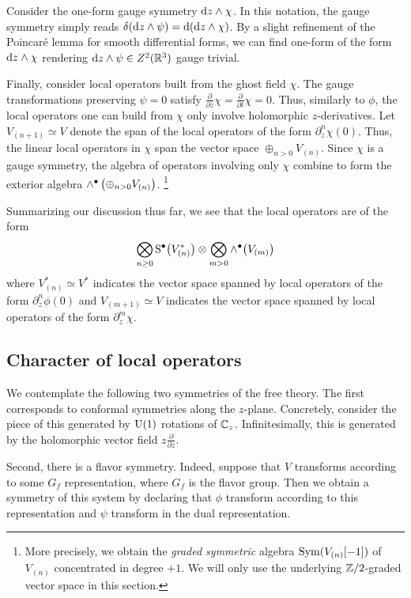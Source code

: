 \documentclass[11pt]{amsart}
\def\zbar{{\overline{z}}}
\def\U{{\rm U}}
\begin{document}
Consider the one-form gauge symmetry ${\rm d} z \wedge \chi$. 
In this notation, the gauge symmetry simply reads $\delta ({\rm d} z \wedge \psi) = {\rm d} ({\rm d} z \wedge \chi)$. 
By a slight refinement of the Poincar\'{e} lemma for smooth differential forms, we can find one-form of the form ${\rm d} z \wedge \chi$ rendering ${\rm d} z \wedge \psi \in Z^2(\mathbb R^3)$ gauge trivial. 

Finally, consider local operators built from the ghost field $\chi$. 
The gauge transformations preserving $\psi = 0$ satisfy $\frac{\partial}{\partial \zbar} \chi = \frac{\partial}{\partial t} \chi = 0$. 
Thus, similarly to $\phi$, the local operators one can build from $\chi$ only involve holomorphic $z$-derivatives. 
Let $V_{(n+1)} \simeq V$ denote the span of the local operators of the form $\partial_z^n \chi(0)$.
Thus, the linear local operators in $\chi$ span the vector space $\oplus_{n > 0} V_{(n)}$.
Since $\chi$ is a gauge symmetry, the algebra of operators involving only $\chi$ combine to form the exterior algebra $\wedge^\bullet \left(\oplus_{n > 0} V_{(n)}\right)$. 
\footnote{More precisely, we obtain the {\em graded symmetric} algebra $\operatorname{Sym}(V_{(n)}[-1])$ of $V_{(n)}$ concentrated in degree $+1$.
We will only use the underlying $\mathbb Z/2$-graded vector space in this section.}

Summarizing our discussion thus far, we see that the local operators are of the form
\[
\bigotimes_{n \geq 0} {\rm S}^\bullet \big(V^*_{(n)}\big) \otimes \bigotimes_{m > 0} \wedge^\bullet \big(V_{(m)}\big)
\]
where $V_{(n)}^* \simeq V^*$ indicates the vector space spanned by local operators of the form $\partial^n_{z} \phi(0)$ and $V_{(m+1)} \simeq V$ indicates the vector space spanned by local operators of the form $\partial^{m}_z \chi$. 

\subsection*{Character of local operators}

We contemplate the following two symmetries of the free theory.
The first corresponds to conformal symmetries along the $z$-plane. 
Concretely, consider the piece of this generated by $\U(1)$ rotations of $\mathbb C_z$.
Infinitesimally, this is generated by the holomorphic vector field $z \frac{\partial}{\partial z}$. 

Second, there is a flavor symmetry.
Indeed, suppose that $V$ transforms according to some $G_f$ representation, where $G_f$ is the flavor group. 
Then we obtain a symmetry of this system by declaring that $\phi$ transform according to this representation and $\psi$ transform in the dual representation.
\end{document}
